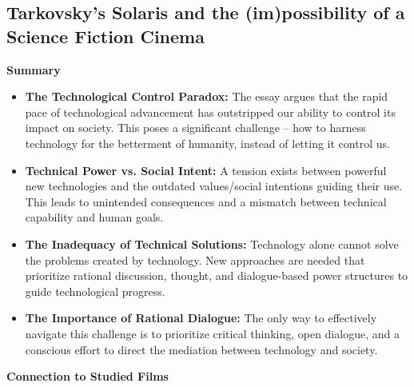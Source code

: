 \documentclass[11pt,fleqn]{book} %
\begin{document}
\subsection{Tarkovsky’s Solaris and the (im)possibility of a Science Fiction Cinema}
\textbf{Summary}

\begin{itemize}
\item \textbf{The Technological Control Paradox:} The essay argues that the rapid pace of technological advancement has outstripped our ability to control its impact on society. This poses a significant challenge – how to harness technology for the betterment of humanity, instead of letting it control us. 

\item \textbf{Technical Power vs. Social Intent:}  A tension exists between powerful new technologies and the outdated values/social intentions guiding their use. This leads to unintended consequences and a mismatch between technical capability and human goals.

\item \textbf{The Inadequacy of Technical Solutions:} Technology alone cannot solve the problems created by technology. New approaches are needed that prioritize rational discussion, thought, and dialogue-based power structures to guide technological progress.

\item \textbf{The Importance of Rational Dialogue:} The only way to effectively navigate this challenge is to prioritize critical thinking, open dialogue, and a conscious effort to direct the mediation between technology and society.
\end{itemize}
\vspace{5pt}
\textbf{Connection to Studied Films}
\end{document}
